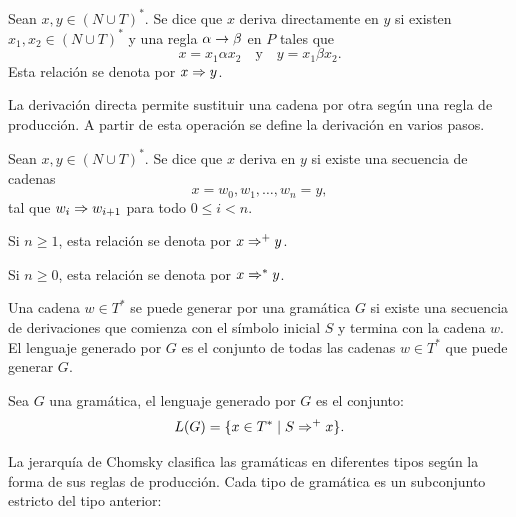 \begin{definition}
	Sean $x,y \in (N \cup T)^*$. Se dice que $x$ deriva directamente en $y$ si existen $x_1, x_2 \in (N \cup T)^*$ y una regla $\alpha \rightarrow \beta$ en $P$ tales que
	$$
		x = x_1 \alpha x_2 \quad \text{y} \quad y = x_1 \beta x_2.
	$$
	Esta relación se denota por $x \Rightarrow y$.
\end{definition}

La derivación directa permite sustituir una cadena por otra según una regla de producción. A partir de esta operación se define la derivación en varios pasos.

\begin{definition}
	Sean $x,y \in (N \cup T)^*$. Se dice que $x$ deriva en $y$ si existe una secuencia de cadenas
	$$
		x = w_0, w_1, \dots, w_n = y,
	$$
	tal que $w_i \Rightarrow w_{i+1}$ para todo $0 \leq i < n$.

	Si $n \geq 1$, esta relación se denota por $x \Rightarrow^+ y$.

	Si $n \geq 0$, esta relación se denota por $x \Rightarrow^* y$.
\end{definition}

Una cadena $w \in T^*$ se puede generar por una gramática $G$ si existe una secuencia de derivaciones que comienza con el símbolo inicial $S$ y termina con la cadena $w$. El lenguaje generado por $G$ es el conjunto de todas las cadenas $w \in T^*$ que puede generar $G$.

\begin{definition}
	Sea $G$ una gramática, el lenguaje generado por $G$ es el conjunto:
	$$
		L(G) = \{x \in T^* \;|\; S \Rightarrow^+ x\}.
	$$
\end{definition}

La jerarquía de Chomsky \cite{hunter2020chomsky} clasifica las gramáticas en diferentes tipos según la forma de sus reglas de producción. Cada tipo de gramática es un subconjunto estricto del tipo anterior:

